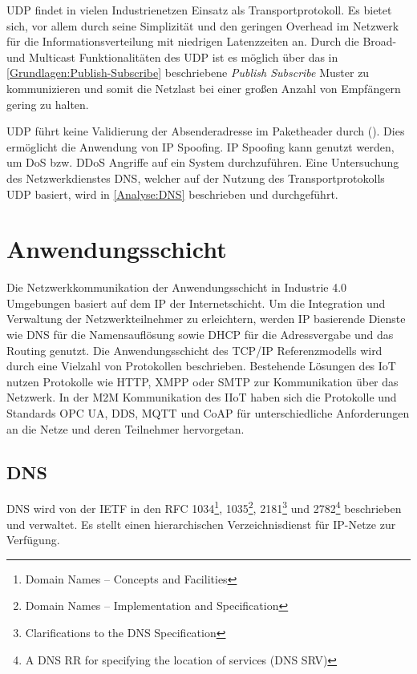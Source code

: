 \ac{UDP} findet in vielen Industrienetzen Einsatz als Transportprotokoll. Es bietet sich, vor allem durch seine Simplizität und den geringen Overhead im Netzwerk für die Informationsverteilung mit niedrigen Latenzzeiten an. Durch die Broad- und Multicast Funktionalitäten des \ac{UDP} ist es möglich über das in \autoref{Grundlagen:Publish-Subscribe} beschriebene \textit{Publish Subscribe} Muster zu kommunizieren und somit die Netzlast bei einer großen Anzahl von Empfängern gering zu halten.

\ac{UDP} führt keine Validierung der Absenderadresse im Paketheader durch (\cite{UDP2003}). Dies ermöglicht die Anwendung von \ac{IP} Spoofing. \ac{IP} Spoofing kann genutzt werden, um \ac{DoS} bzw. \ac{DDoS} Angriffe auf ein System durchzuführen. Eine Untersuchung des Netzwerkdienstes \ac{DNS}, welcher auf der Nutzung des Transportprotokolls \ac{UDP} basiert, wird in \autoref{Analyse:DNS} beschrieben und durchgeführt.

\section{Anwendungsschicht}
\label{Analyse:Anwendungsschicht}
Die Netzwerkkommunikation der Anwendungsschicht in Industrie 4.0 Umgebungen basiert auf dem \ac{IP} der Internetschicht. Um die Integration und Verwaltung der Netzwerkteilnehmer zu erleichtern, werden \ac{IP} basierende Dienste wie \ac{DNS} für die Namensauflösung sowie \ac{DHCP} für die Adressvergabe und das Routing genutzt. Die Anwendungsschicht des \ac{TCP}/\ac{IP} Referenzmodells wird durch eine Vielzahl von Protokollen beschrieben. Bestehende Lösungen des \ac{IoT} nutzen Protokolle wie \ac{HTTP}, \ac{XMPP} oder \ac{SMTP} zur Kommunikation über das Netzwerk. In der \ac{M2M} Kommunikation des \ac{IIoT} haben sich die Protokolle und Standards \ac{OPC UA}, \ac{DDS}, \ac{MQTT} und \ac{CoAP} für unterschiedliche Anforderungen an die Netze und deren Teilnehmer hervorgetan. 

\subsection{\ac{DNS}}
\label{Analyse:DNS}
\ac{DNS} wird von der \ac{IETF} in den \ac{RFC} 1034\footnote{Domain Names – Concepts and Facilities}, 1035\footnote{Domain Names – Implementation and Specification}, 2181\footnote{Clarifications to the DNS Specification} und 2782\footnote{A DNS RR for specifying the location of services (DNS SRV)} beschrieben und verwaltet. Es stellt einen hierarchischen Verzeichnisdienst für \ac{IP}-Netze zur Verfügung. 

